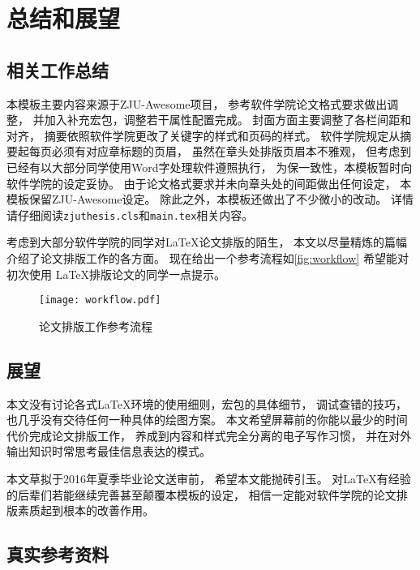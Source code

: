 
\chapter{总结和展望}

\section{相关工作总结}

本模板主要内容来源于ZJU-Awesome项目，
参考软件学院论文格式要求做出调整，
并加入补充宏包，调整若干属性配置完成。
封面方面主要调整了各栏间距和对齐，
摘要依照软件学院更改了关键字的样式和页码的样式。
软件学院规定从摘要起每页必须有对应章标题的页眉，
虽然在章头处排版页眉本不雅观，
但考虑到已经有以大部分同学使用Word字处理软件遵照执行，
为保一致性，本模板暂时向软件学院的设定妥协。
由于论文格式要求并未向章头处的间距做出任何设定，
本模板保留ZJU-Awesome设定。
除此之外，本模板还做出了不少微小的改动。
详情请仔细阅读\texttt{zjuthesis.cls}和\texttt{main.tex}相关内容。

考虑到大部分软件学院的同学对\LaTeX 论文排版的陌生，
本文以尽量精炼的篇幅介绍了论文排版工作的各方面。
现在给出一个参考流程如\autoref{fig:workflow} 希望能对初次使用
\LaTeX 排版论文的同学一点提示。

\begin{figure}[htbp]
    \centering
    \texttt{[image: workflow.pdf]}
    \caption{论文排版工作参考流程}
    \label{fig:workflow}
\end{figure}

\section{展望}

本文没有讨论各式\LaTeX 环境的使用细则，宏包的具体细节，
调试查错的技巧，也几乎没有交待任何一种具体的绘图方案。
本文希望屏幕前的你能以最少的时间代价完成论文排版工作，
养成到内容和样式完全分离的电子写作习惯，
并在对外输出知识时常思考最佳信息表达的模式。

本文草拟于2016年夏季毕业论文送审前，
希望本文能抛砖引玉。
对\LaTeX 有经验的后辈们若能继续完善甚至颠覆本模板的设定，
相信一定能对软件学院的论文排版素质起到根本的改善作用。

\section{真实参考资料}

